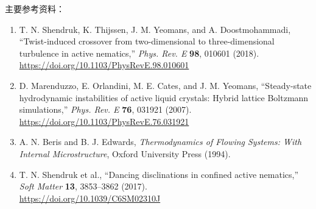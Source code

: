 \documentclass[UTF8,11pt,a4paper]{ctexart}
\begin{document}
主要参考资料：
\begin{enumerate}
  \item T. N. Shendruk, K. Thijssen, J. M. Yeomans, and A. Doostmohammadi,
  ``Twist-induced crossover from two-dimensional to three-dimensional
  turbulence in active nematics,'' \emph{Phys. Rev. E} \textbf{98},
  010601 (2018).\\
  \url{https://doi.org/10.1103/PhysRevE.98.010601}

  \item D. Marenduzzo, E. Orlandini, M. E. Cates, and J. M. Yeomans,
  ``Steady-state hydrodynamic instabilities of active liquid crystals:
  Hybrid lattice Boltzmann simulations,'' \emph{Phys. Rev. E} \textbf{76},
  031921 (2007).\\
  \url{https://doi.org/10.1103/PhysRevE.76.031921}

  \item A. N. Beris and B. J. Edwards,
  \emph{Thermodynamics of Flowing Systems: With Internal Microstructure},
  Oxford University Press (1994).

  \item T. N. Shendruk et al., ``Dancing disclinations in confined active
  nematics,'' \emph{Soft Matter} \textbf{13}, 3853--3862 (2017).\\
  \url{https://doi.org/10.1039/C6SM02310J}
\end{enumerate}
\end{document}
